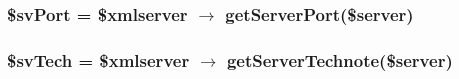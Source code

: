 \subsubsection{\setlength{\rightskip}{0pt plus 5cm}\$sv\-Port = \$xmlserver $\rightarrow$ get\-Server\-Port(\$server)}\label{serverdetails_8php_b67e390157847ac792f5e5dd4958deaf}


\subsubsection{\setlength{\rightskip}{0pt plus 5cm}\$sv\-Tech = \$xmlserver $\rightarrow$ get\-Server\-Technote(\$server)}\label{serverdetails_8php_b9e219bb99f9b622d2bc34ea9d35616d}



